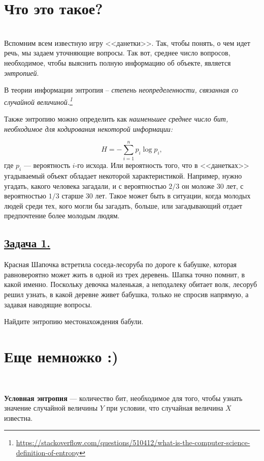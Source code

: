 \section*{Что это такое?}~\
\\ 

Вспомним всем известную игру <<данетки>>. Так, чтобы понять, о чем идет речь, мы задаем уточняющие вопросы. Так вот, среднее число вопросов, необходимое, чтобы выяснить полную информацию об объекте, является \textit{энтропией}.

В теории информации энтропия -- \textit{степень неопределенности, связанная со случайной величиной.\footnote{\url{https://stackoverflow.com/questions/510412/what-is-the-computer-science-definition-of-entropy}}}

Также энтропию можно определить как \textit{наименьшее среднее число бит, необходимое для кодирования некоторой информации:}

\[H=-\sum\limits_{i=1}^n p_i\log p_i, \]
где $p_i$ --- вероятность $i$-го исхода. Или вероятность того, что в <<данетках>> угадываемый объект обладает некоторой характеристикой. Например, нужно угадать, какого человека загадали, и с вероятностью $2/3$ он моложе 30 лет, с вероятностью $1/3$ старше 30 лет. Такое может быть в ситуации, когда молодых людей среди тех, кого могли бы загадать, больше, или загадывающий отдает предпочтение более молодым людям. 

\subsection*{\hyperref[sec:sol_problem1]{Задача 1.}}\label{sec:problem1} 
Красная Шапочка встретила соседа-лесоруба по дороге к бабушке, которая равновероятно может жить в одной из трех деревень. Шапка точно помнит, в какой именно. Поскольку девочка маленькая, а неподалеку обитает волк, лесоруб решил узнать, в какой деревне живет бабушка, только не спросив напрямую, а задавая наводящие вопросы. 

Найдите энтропию местонахождения бабули. 

\section*{Еще немножко :)}~\
\\

\begin{siderules}
    \textbf{Условная энтропия} --- количество бит, необходимое для того, чтобы узнать значение случайной величины $Y$ при условии, что случайная величина $X$ известна.
\end{siderules}

